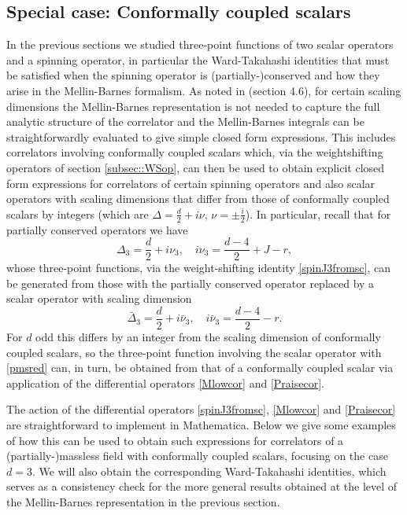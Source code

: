 \documentclass[11pt,a4paper]{article}
\begin{document}
\subsection{Special case: Conformally coupled scalars}
\label{subsec::cc3pt}

In the previous sections we studied three-point functions of two scalar operators and a spinning operator, in particular the Ward-Takahashi identities that must be satisfied when the spinning operator is (partially-)conserved and how they arise in the Mellin-Barnes formalism. As noted in \cite{Sleight:2019hfp} (section 4.6), for certain scaling dimensions the Mellin-Barnes representation is not needed to capture the full analytic structure of the correlator and the Mellin-Barnes integrals can be straightforwardly evaluated to give simple closed form expressions. This includes correlators involving conformally coupled scalars which, via the weightshifting operators of section \ref{subsec::WSop}, can then be used to obtain explicit closed form expressions for correlators of certain spinning operators and also scalar operators with scaling dimensions that differ from those of conformally coupled scalars by integers (which are $\Delta=\tfrac{d}{2}+i\nu, \, \nu=\pm \tfrac{i}{2}$). In particular, recall that for partially conserved operators we have
\begin{equation}
   \Delta_3 = \frac{d}{2}+i\nu_3, \quad i\nu_3 = \frac{d-4}{2}+J-r,
\end{equation}
whose three-point functions, via the weight-shifting identity \eqref{spinJ3fromsc}, can be generated from those with the partially conserved operator replaced by a scalar operator with scaling dimension
\begin{equation}\label{pmsred}
    {\bar \Delta}_3 = \frac{d}{2}+i{\bar \nu}_3, \quad i{\bar \nu}_3 = \frac{d-4}{2}-r.
\end{equation}
For $d$ odd this differs by an integer from the scaling dimension of conformally coupled scalars, so the three-point function involving the scalar operator with \eqref{pmsred} can, in turn, be obtained from that of a conformally coupled scalar via application of the differential operators \eqref{Mlowcor} and \eqref{Praisecor}.

The action of the differential operators \eqref{spinJ3fromsc}, \eqref{Mlowcor} and \eqref{Praisecor} are straightforward to implement in Mathematica. Below we give some examples of how this can be used to obtain such expressions for correlators of a (partially-)massless field with conformally coupled scalars, focusing on the case $d=3$. We will also obtain the corresponding Ward-Takahashi identities, which serves as a consistency check for the more general results obtained at the level of the Mellin-Barnes representation in the previous section.
\end{document}
